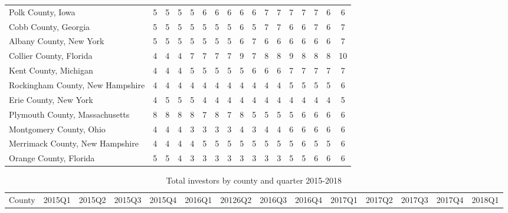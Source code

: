 \begin{landscape}
\begin{longtable}{lcccccccccccccccc}
	Polk County, Iowa & 5 & 5 & 5 & 5 & 6 & 6 & 6 & 6 & 6 & 7 & 7 & 7 & 7 & 7 & 6 & 6 \\
	Cobb County, Georgia & 5 & 5 & 5 & 5 & 5 & 5 & 5 & 6 & 5 & 7 & 7 & 6 & 6 & 7 & 6 & 7 \\
	Albany County, New York & 5 & 5 & 5 & 5 & 5 & 5 & 5 & 6 & 7 & 6 & 6 & 6 & 6 & 6 & 6 & 7 \\
	Collier County, Florida & 4 & 4 & 4 & 7 & 7 & 7 & 7 & 9 & 7 & 8 & 8 & 9 & 8 & 8 & 8 & 10 \\
	Kent County, Michigan & 4 & 4 & 4 & 5 & 5 & 5 & 5 & 5 & 6 & 6 & 6 & 7 & 7 & 7 & 7 & 7 \\
	Rockingham County, New Hampshire & 4 & 4 & 4 & 4 & 4 & 4 & 4 & 4 & 4 & 4 & 4 & 5 & 5 & 5 & 5 & 6 \\
	Erie County, New York & 4 & 5 & 5 & 5 & 4 & 4 & 4 & 4 & 4 & 4 & 4 & 4 & 4 & 4 & 4 & 5 \\
	Plymouth County, Massachusetts & 8 & 8 & 8 & 8 & 7 & 8 & 7 & 8 & 5 & 5 & 5 & 5 & 6 & 6 & 6 & 6 \\
	Montgomery County, Ohio & 4 & 4 & 4 & 3 & 3 & 3 & 3 & 4 & 3 & 4 & 4 & 6 & 6 & 6 & 6 & 6 \\
	Merrimack County, New Hampshire & 4 & 4 & 4 & 4 & 5 & 5 & 5 & 5 & 5 & 5 & 5 & 5 & 6 & 5 & 5 & 6 \\
	Orange County, Florida & 5 & 5 & 4 & 3 & 3 & 3 & 3 & 3 & 3 & 3 & 3 & 5 & 5 & 6 & 6 & 6

\end{longtable}

\newpage

\begin{longtable}{lccccccccccccc}
	\setlength{\tabcolsep}{8pt}
	\caption[Total Investors by County and Quarter 2015-2018]{Total investors by county and quarter 2015-2018}
	County &2015Q1 &2015Q2 &2015Q3 &2015Q4 &2016Q1 &20126Q2 &2016Q3 &2016Q4 &2017Q1 & 2017Q2 &2017Q3 &2017Q4 &2018Q1 \\
	

\end{longtable}
\end{landscape}
